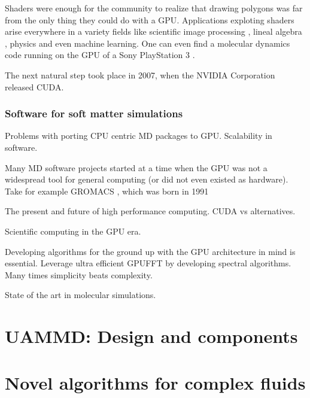 \documentclass[ twoside,openright,titlepage,numbers=noenddot,%
headinclude,footinclude,cleardoublepage=empty,abstract=on,
BCOR=5mm,paper=a4,fontsize=11pt
]{scrreprt}
\newcommand{\gpu}{\gls{GPU}\xspace}
\begin{document}
Shaders were enough for the community to realize that drawing polygons was far from the only thing they could do with a \gpu\cite{gpgpu2002}. Applications exploting shaders arise everywhere in a variety fields like scientific image processing \cite{gpuimage2003, gpuimage2006}, lineal algebra \cite{gpulinalg2001, gpulinalg2003a, gpulinalg2003b}, physics \cite{gpulbm2004} and even machine learning\cite{gpuml2005, gpuml1998}. One can even find a molecular dynamics code running on the \gpu of a Sony PlayStation 3 \cite{ps3md2009}.

The next natural step took place in 2007, when the NVIDIA Corporation released CUDA\cite{cuda}.
\section{Software for soft matter simulations}
Problems with porting CPU centric \gls{MD} packages to \gpu. Scalability in software.

Many \gls{MD} software projects started at a time when the \gpu was not a widespread tool for general computing (or did not even existed as hardware). Take for example GROMACS \cite{gromacs}, which was born in 1991

The present and future of high performance computing.
CUDA vs alternatives.

Scientific computing in the GPU era.

Developing algorithms for the ground up with the GPU architecture in mind is essential. Leverage ultra efficient \gpu \gls{FFT} by developing spectral algorithms. Many times simplicity beats complexity.

State of the art in molecular simulations.

\cleardoublepage
{}
\part{UAMMD: Design and components}\label{pt:uammd}

\newpage
\newpage
\newpage
\cleardoublepage
\part{Novel algorithms for complex fluids}\label{pt:algo}

\newpage
\newpage
\newpage
\cleardoublepage
\end{document}
